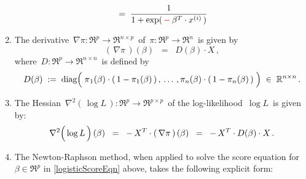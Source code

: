 \begin{proposition}
\begin{enumerate}
\begin{equation*}
	\; = \;
		\dfrac{1}{1 + \exp(\,{\color{red}-}\,\beta^{T} \cdot x^{(i)}\,)}
	\end{equation*}
\item\label{DerivativePi}
	The derivative
	\,$\nabla\pi : \Re^{p} \longrightarrow \Re^{n \times p}$\,
	of
	\,$\pi : \Re^{p} \longrightarrow \Re^{n}$\,
	is given by
	\begin{equation*}
	\left(\,\nabla\pi\,\right)(\beta)
	\;\; = \;\;
		D(\beta) \cdot X\,,
	\end{equation*}
	where
	\,$D : \Re^{p} \longrightarrow \Re^{n \times n}$\,
	is defined by
	\begin{equation*}
	D(\beta) \; := \; \diag\!\left(\;
		\overset{{\color{white}-}}{\pi}_{1}(\beta) \cdot (\,1-\pi_{1}(\beta)\,)\,,
		\,\ldots\,,
		\pi_{n}(\beta) \cdot (\,1-\pi_{n}(\beta)\,)
		\;\right)
		\;\in\;
		\Re^{n \times n}\,.
	\end{equation*}
\item\label{HessianLogLikelihood}
	The Hessian
	\,$\nabla^{2}\!\left(\,\log L\,\right) : \Re^{p} \longrightarrow \Re^{p \times p}$\,
	of the log-likelihood \,$\log L$\, is given by:
	\begin{equation*}
	\nabla^{2}\!\left(\,\overset{{\color{white}.}}{\log}\,L\,\right)(\beta)
	\;\; = \;\;
		-\, X^{T} \cdot \left(\,\nabla\pi\,\right)(\beta)
	\;\; = \;\;
		-\, X^{T} \cdot D(\beta) \cdot X\,.
	\end{equation*}
\newpage
\item
	The Newton-Raphson method, when applied to solve the score equation for $\beta \in \Re^{p}$
	in \eqref{logisticScoreEqn} above, takes the following explicit form:
	\begin{center}

\end{center}
\end{enumerate}
\end{proposition}
